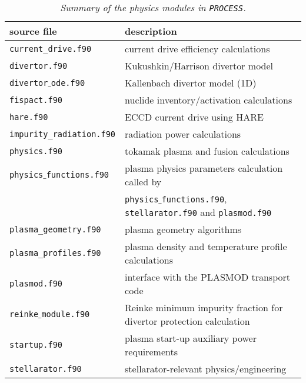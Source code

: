 \documentclass[11pt,a4paper]{report}
\newcommand{\process}{\mbox{\texttt{PROCESS}}}
\begin{document}
\begin{table}[tbph]
\begin{center}

\begin{tabular}{||l||l||} 
	\hline
source file                          & description \\
	\hline
\texttt{current\_drive.f90}          & current drive efficiency calculations \\
\texttt{divertor.f90}                & Kukushkin/Harrison divertor model     \\
\texttt{divertor$\_$ode.f90}         & Kallenbach divertor model (1D) \\
\texttt{fispact.f90}                 & nuclide inventory/activation calculations \\
\texttt{hare.f90}                    & ECCD current drive using HARE \\
\texttt{impurity\_radiation.f90}     & radiation power calculations \\
\texttt{physics.f90}                 & tokamak plasma and fusion calculations \\
\texttt{physics$\_$functions.f90}    & plasma physics parameters calculation called by \\
                                     & \texttt{physics$\_$functions.f90}, \texttt{stellarator.f90} and \texttt{plasmod.f90}\\
\texttt{plasma\_geometry.f90}        & plasma geometry algorithms \\
\texttt{plasma\_profiles.f90}        & plasma density and temperature profile calculations \\
\texttt{plasmod.f90}                 & interface with the PLASMOD transport code\\                                     
\texttt{reinke$\_$module.f90}        & Reinke minimum impurity fraction for divertor protection calculation \\                                                    
\texttt{startup.f90}                 & plasma start-up auxiliary power requirements \\
\texttt{stellarator.f90}             & stellarator-relevant physics/engineering \\
	\hline
\end{tabular}
\end{center}
\caption[Summary of physics modules]
{\label{tab:physics}
  \textit{Summary of the physics modules in \process.}
}
\end{table}
\end{document}
